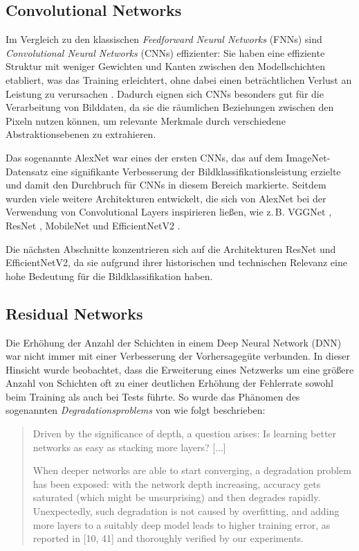\subsection{Convolutional Networks}

Im Vergleich zu den klassischen \textit{Feedforward Neural Networks} (FNNs) sind \textit{Convolutional Neural Networks} (CNNs) effizienter: Sie haben eine effiziente Struktur mit weniger Gewichten und Kanten zwischen den Modellschichten etabliert, was das Training erleichtert, ohne dabei einen beträchtlichen Verlust an Leistung zu verursachen \cite{alex2012alexnet}. Dadurch eignen sich CNNs besonders gut für die Verarbeitung von Bilddaten, da sie die räumlichen Beziehungen zwischen den Pixeln nutzen können, um relevante Merkmale durch verschiedene Abstraktionsebenen zu extrahieren.

Das sogenannte AlexNet \cite{alex2012alexnet} war eines der ersten CNNs, das auf dem ImageNet-Datensatz eine signifikante Verbesserung der Bildklassifikationsleistung erzielte und damit den Durchbruch für CNNs in diesem Bereich markierte. Seitdem wurden viele weitere Architekturen entwickelt, die sich von AlexNet bei der Verwendung von Convolutional Layers inspirieren ließen, wie z.\,B. VGGNet \cite{simonyan2015vgg}, ResNet \cite{he2016resnet}, MobileNet \cite{howard2017mobilenet} und EfficientNetV2 \cite{tan2021efficientnetv2}.

Die nächsten Abschnitte konzentrieren sich auf die Architekturen ResNet und EfficientNetV2, da sie aufgrund ihrer historischen und technischen Relevanz eine hohe Bedeutung für die Bildklassifikation haben.

\subsection{Residual Networks}

Die Erhöhung der Anzahl der Schichten in einem Deep Neural Network (DNN) war nicht immer mit einer Verbesserung der Vorhersagegüte verbunden. In dieser Hinsicht wurde beobachtet, dass die Erweiterung eines Netzwerks um eine größere Anzahl von Schichten oft zu einer deutlichen Erhöhung der Fehlerrate sowohl beim Training als auch bei Tests führte. So wurde das Phänomen des sogenannten \textit{Degradationsproblems} von \cite{he2016resnet} wie folgt beschrieben:

\begin{quote}
    Driven by the significance of depth, a question arises: Is learning better networks as easy as stacking more layers? [...]

    When deeper networks are able to start converging, a degradation problem has been exposed: with the network depth increasing, accuracy gets saturated (which might be unsurprising) and then degrades rapidly. Unexpectedly, such degradation is not caused by overfitting, and adding more layers to a suitably deep model leads to higher training error, as reported in [10, 41] and thoroughly verified by our experiments.
\end{quote}

